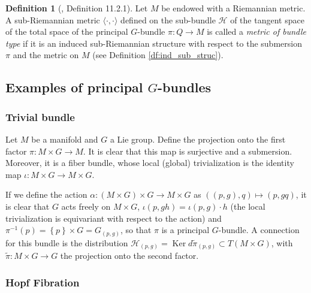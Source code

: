 \documentclass[12pt, letterpaper, reqno]{amsart}
\theoremstyle{definition}
\newtheorem{df}{Definition}
\theoremstyle{plain}
\theoremstyle{remark}
\begin{document}
\begin{df}[\cite{montgomery2002tour}, Definition 11.2.1]
	Let $ M $ be endowed with a Riemannian metric. A sub-Riemannian metric $  \langle\cdot,\cdot\rangle $ defined on the sub-bundle $ \mathcal{H} $  of the tangent space of the total space of the principal $ G $-bundle $ \pi: Q \rightarrow {M}
	$ is called a \textit{metric of bundle type} if it is an induced sub-Riemannian structure with respect to the submersion $ \pi $ and the metric on $ M $  (see Definition \ref{df:ind_sub_struc}).
\end{df}

\subsection{Examples of principal $ G $-bundles}%
\label{sub:examples_of_principal_g_bundles}

\subsubsection{Trivial bundle}%
\label{ssub:projection_of_cartesian_product_of_manifolds}

Let $ M$ be a manifold and $ G $ a Lie group. Define the projection onto the first factor $ \pi: M\times G \rightarrow M. $ It is clear that this map is surjective and a submersion. Moreover, it is a fiber bundle, whose local (global) trivialization is the identity map $ \iota : M\times G \rightarrow M\times G $.   

If we define the action $ \alpha: (M\times G) \times G \rightarrow M\times G $ as $ ((p, g),q)\mapsto (p,gq)  $, it is clear that $ G $ acts freely on $ M\times G $, $\iota(p, gh) = \iota(p,g)\cdot h $ (the local trivialization is equivariant with respect to the action) and $ \pi^{-1}(p) = \left\{ p \right\}\times G = G_{(p,g)} $, so that $ \pi $ is a principal $ G $-bundle. A connection for this bundle is the distribution $ \mathcal{H}_{(p,g)}= \operatorname{Ker} d\tilde{\pi}_(p,g)\subset T(M\times G) $, with $ \tilde{\pi}:M\times G \rightarrow G $ the projection onto the second factor.
\subsubsection{Hopf Fibration}%
\label{ssub:hopf_fibration}
\end{document}
